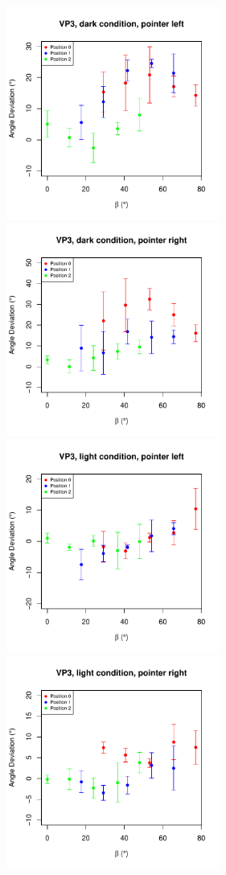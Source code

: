 \begin{figure}
    \includegraphics[width = 7cm]{Images/plots/AngleDevVP3DarkLeft.pdf}
    \includegraphics[width = 7cm]{Images/plots/AngleDevVP3DarkRight.pdf}
    \includegraphics[width = 7cm]{Images/plots/AngleDevVP3LightLeft.pdf}
    \includegraphics[width = 7cm]{Images/plots/AngleDevVP3LightRight.pdf}

\end{figure}
